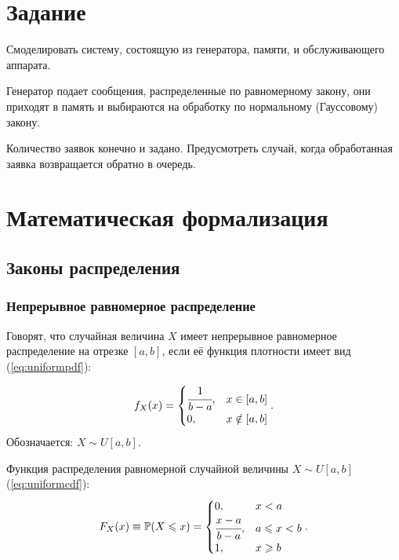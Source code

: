 \chapter{Задание}
Смоделировать систему, состоящую из генератора, памяти, и обслуживающего аппарата. 

Генератор подает сообщения, распределенные по равномерному закону, они приходят в память и выбираются на обработку по нормальному (Гауссовому) закону.


Количество заявок конечно и задано. Предусмотреть случай, когда обработанная заявка возвращается обратно в очередь. 


\chapter{Математическая формализация}

\section{Законы распределения}

\subsection{Непрерывное равномерное распределение}
Говорят, что случайная величина $X$ имеет непрерывное равномерное распределение на отрезке $\displaystyle [a,b]$, если её  функция плотности имеет вид (\ref{eq:uniformpdf}):

\begin{equation}\label{eq:uniformpdf}
	f_{X}(x) = \begin{cases}
		\cfrac{1}{b - a}, & x \in [a,b] \\
		0, & x \notin [a,b] \\
	\end{cases}.
\end{equation}
Обозначается: $X\sim U[a,b]$.

\noindent Функция распределения равномерной случайной величины  $X\sim U[a,b]$ (\ref{eq:uniformcdf}):
\begin{equation}\label{eq:uniformcdf}
	F_{X}(x)\equiv \mathbb {P} (X\leqslant x) = 
	\begin{cases}
		0, & x < a \\
		\cfrac{x - a}{b - a}, & a\leqslant x < b \\
		1, & x\geqslant b
	\end{cases}.
\end{equation}


